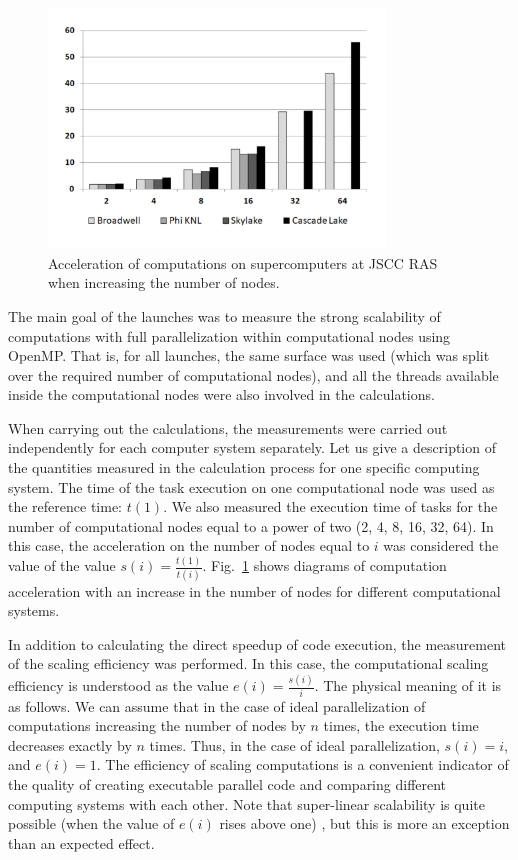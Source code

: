 \documentclass[
11pt,%
tightenlines,%
twoside,%
onecolumn,%
nofloats,%
nobibnotes,%
nofootinbib,%
superscriptaddress,%
noshowpacs,%
centertags]%
{revtex4}
\begin{document}
\begin{figure}[h]
\includegraphics[width=0.8\textwidth]{pics/speedup.pdf}
\caption{Acceleration of computations on supercomputers at JSCC RAS when increasing the number of nodes.}\label{fig:speedup}
\end{figure}

The main goal of the launches was to measure the strong scalability of computations with full parallelization within computational nodes using OpenMP.
That is, for all launches, the same surface was used (which was split over the required number of computational nodes), and all the threads available inside the computational nodes were also involved in the calculations.

When carrying out the calculations, the measurements were carried out independently for each computer system separately.
Let us give a description of the quantities measured in the calculation process for one specific computing system.
The time of the task execution on one computational node was used as the reference time: $ t(1) $.
We also measured the execution time of tasks for the number of computational nodes equal to a power of two (2, 4, 8, 16, 32, 64).
In this case, the acceleration on the number of nodes equal to $ i $ was considered the value of the value $ s(i) = \frac{t(1)}{t(i)} $.
Fig.~\ref{fig:speedup} shows diagrams of computation acceleration with an increase in the number of nodes for different computational systems.

In addition to calculating the direct speedup of code execution, the measurement of the scaling efficiency was performed.
In this case, the computational scaling efficiency is understood as the value $ e(i) = \frac{s(i)}{i} $.
The physical meaning of it is as follows.
We can assume that in the case of ideal parallelization of computations increasing the number of nodes by $ n $ times, the execution time decreases exactly by $ n $ times.
Thus, in the case of ideal parallelization, $ s (i) = i $, and $ e(i) = 1 $.
The efficiency of scaling computations is a convenient indicator of the quality of creating executable parallel code and comparing different computing systems with each other.
Note that super-linear scalability is quite possible (when the value of $ e(i) $ rises above one) \cite{Benderskiy_Scaling}, but this is more an exception than an expected effect.
\end{document}
